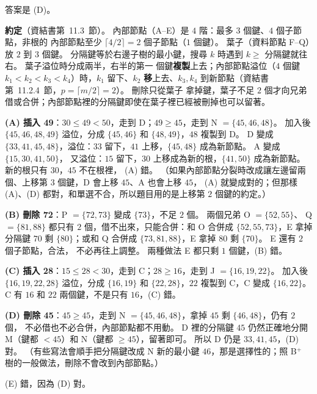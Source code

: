 \begin{pastsoln}
答案是 (D)。

\textbf{約定}（資結書第~11.3~節）。 內部節點（A--E）是 $4$ 階：最多 $3$ 個鍵、$4$ 個子節點，非根的
內部節點至少 $\lceil 4/2 \rceil = 2$ 個子節點（$1$ 個鍵）。 葉子（資料節點 F--Q）放 $2$ 到 $3$ 個鍵。
分隔鍵等於右邊子樹的最小鍵，搜尋 $k$ 時遇到 $k \ge$ 分隔鍵就往右。 葉子溢位時分成兩半，右半的第一
個鍵\textbf{複製}上去；內部節點溢位（$4$ 個鍵 $k_1 < k_2 < k_3 < k_4$）時，$k_1$ 留下、$k_2$
\textbf{移}上去、$k_3, k_4$ 到新節點（資結書第~11.2.4~節，$p = \lceil m/2 \rceil = 2$）。 刪除只從葉子
拿掉鍵，葉子不足 $2$ 個才向兄弟借或合併；內部節點裡的分隔鍵即使在葉子裡已經被刪掉也可以留著。

\textbf{(A) 插入 49}：$30 \le 49 < 50$，走到 D；$49 \ge 45$，走到 N $= \{45, 46, 48\}$。 加入後
$\{45, 46, 48, 49\}$ 溢位，分成 $\{45, 46\}$ 和 $\{48, 49\}$，$48$ 複製到 D。 D 變成
$\{33, 41, 45, 48\}$，溢位：$33$ 留下，$41$ 上移，$\{45, 48\}$ 成為新節點。 A 變成 $\{15, 30, 41, 50\}$，
又溢位：$15$ 留下，$30$ 上移成為新的根，$\{41, 50\}$ 成為新節點。 新的根只有 $30$，$45$ 不在根裡，
(A) 錯。 （如果內部節點分裂時改成讓左邊留兩個、上移第 $3$ 個鍵，D 會上移 $45$、A 也會上移 $45$，
(A) 就變成對的；但那樣 (A)、(D) 都對，和單選不合，所以題目用的是上移第 $2$ 個鍵的約定。）

\textbf{(B) 刪除 72}：P $= \{72, 73\}$ 變成 $\{73\}$，不足 $2$ 個。 兩個兄弟 O $= \{52, 55\}$、
Q $= \{81, 88\}$ 都只有 $2$ 個，借不出來，只能合併：和 O 合併成 $\{52, 55, 73\}$，E 拿掉分隔鍵
$70$ 剩 $\{80\}$；或和 Q 合併成 $\{73, 81, 88\}$，E 拿掉 $80$ 剩 $\{70\}$。 E 還有 $2$ 個子節點，合法，
不必再往上調整。 兩種做法 E 都只剩 $1$ 個鍵，(B) 錯。

\textbf{(C) 插入 28}：$15 \le 28 < 30$，走到 C；$28 \ge 16$，走到 J $= \{16, 19, 22\}$。 加入後
$\{16, 19, 22, 28\}$ 溢位，分成 $\{16, 19\}$ 和 $\{22, 28\}$，$22$ 複製到 C，C 變成 $\{16, 22\}$。 C 有
$16$ 和 $22$ 兩個鍵，不是只有 $16$，(C) 錯。

\textbf{(D) 刪除 45}：$45 \ge 45$，走到 N $= \{45, 46, 48\}$，拿掉 $45$ 剩 $\{46, 48\}$，仍有 $2$ 個，
不必借也不必合併，內部節點都不用動。 D 裡的分隔鍵 $45$ 仍然正確地分開 M（鍵都 $< 45$）和 N（鍵都
$\ge 45$），留著即可。 所以 D 仍是 $33, 41, 45$，(D) 對。 （有些寫法會順手把分隔鍵改成 N 新的最小鍵
$46$，那是選擇性的；照 B$^+$ 樹的一般做法，刪除不會改到內部節點。）

(E) 錯，因為 (D) 對。
\end{pastsoln}
